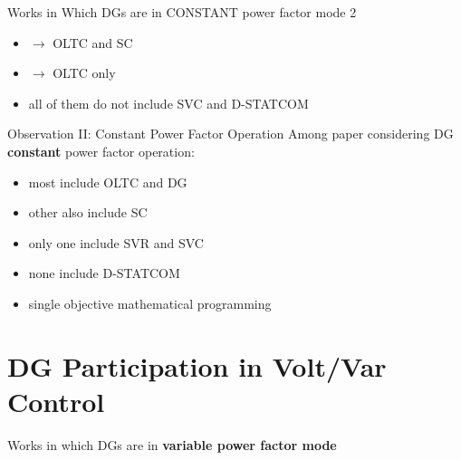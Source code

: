 \documentclass[10pt]{beamer}
\begin{document}
\begin{frame}{Works in Which DGs are in CONSTANT power factor mode 2}
\begin{itemize}
\item {} $\rightarrow$ OLTC and SC
\item %
 $\rightarrow$ OLTC only
\item all of them do not include SVC and D-STATCOM
\end{itemize}
\end{frame}

\begin{frame}{Observation II: Constant Power Factor Operation}
Among paper considering DG \textbf{constant} power factor operation:
\begin{itemize}
\item most include OLTC and DG
\item other  also include SC
\item only one include SVR and SVC
\item none include D-STATCOM
\item single objective mathematical programming
\end{itemize}
\end{frame}

\section{DG Participation in Volt/Var Control}

\begin{frame}
\begin{center}
\huge
Works in which DGs are in \textbf{variable power factor mode}
\end{center}
\end{frame}
\end{document}
